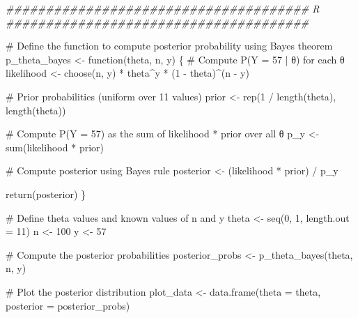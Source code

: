 \documentclass[
  letterpaper,
  DIV=11,
  numbers=noendperiod]{scrartcl}
\newenvironment{Shaded}{\begin{snugshade}}{\end{snugshade}}
\newcommand{\AttributeTok}[1]{\textcolor[rgb]{0.40,0.45,0.13}{#1}}
\newcommand{\CommentTok}[1]{\textcolor[rgb]{0.37,0.37,0.37}{#1}}
\newcommand{\ControlFlowTok}[1]{\textcolor[rgb]{0.00,0.23,0.31}{#1}}
\newcommand{\DecValTok}[1]{\textcolor[rgb]{0.68,0.00,0.00}{#1}}
\newcommand{\DocumentationTok}[1]{\textcolor[rgb]{0.37,0.37,0.37}{\textit{#1}}}
\newcommand{\FunctionTok}[1]{\textcolor[rgb]{0.28,0.35,0.67}{#1}}
\newcommand{\NormalTok}[1]{\textcolor[rgb]{0.00,0.23,0.31}{#1}}
\newcommand{\OtherTok}[1]{\textcolor[rgb]{0.00,0.23,0.31}{#1}}
\newcommand{\SpecialCharTok}[1]{\textcolor[rgb]{0.37,0.37,0.37}{#1}}
\begin{document}
\begin{Shaded}
\begin{Highlighting}[]
\DocumentationTok{\#\#\#\#\#\#\#\#\#\#\#\#\#\#\#\#\#\#\#\#\#\#\#\#\#\#\#\#\#\#\#\#\#\#\#\#\#\# R \#\#\#\#\#\#\#\#\#\#\#\#\#\#\#\#\#\#\#\#\#\#\#\#\#\#\#\#\#\#\#\#\#\#\#\#\#\#}

\CommentTok{\# Define the function to compute posterior probability using Bayes\textquotesingle{} theorem}
\NormalTok{p\_theta\_bayes }\OtherTok{\textless{}{-}} \ControlFlowTok{function}\NormalTok{(theta, n, y) \{}
    \CommentTok{\# Compute P(Y = 57 | θ) for each θ}
\NormalTok{    likelihood }\OtherTok{\textless{}{-}} \FunctionTok{choose}\NormalTok{(n, y) }\SpecialCharTok{*}\NormalTok{ theta}\SpecialCharTok{\^{}}\NormalTok{y }\SpecialCharTok{*}\NormalTok{ (}\DecValTok{1} \SpecialCharTok{{-}}\NormalTok{ theta)}\SpecialCharTok{\^{}}\NormalTok{(n }\SpecialCharTok{{-}}\NormalTok{ y)}

    \CommentTok{\# Prior probabilities (uniform over 11 values)}
\NormalTok{    prior }\OtherTok{\textless{}{-}} \FunctionTok{rep}\NormalTok{(}\DecValTok{1} \SpecialCharTok{/} \FunctionTok{length}\NormalTok{(theta), }\FunctionTok{length}\NormalTok{(theta))}

    \CommentTok{\# Compute P(Y = 57) as the sum of likelihood * prior over all θ}
\NormalTok{    p\_y }\OtherTok{\textless{}{-}} \FunctionTok{sum}\NormalTok{(likelihood }\SpecialCharTok{*}\NormalTok{ prior)}

    \CommentTok{\# Compute posterior using Bayes\textquotesingle{} rule}
\NormalTok{    posterior }\OtherTok{\textless{}{-}}\NormalTok{ (likelihood }\SpecialCharTok{*}\NormalTok{ prior) }\SpecialCharTok{/}\NormalTok{ p\_y}

    \FunctionTok{return}\NormalTok{(posterior)}
\NormalTok{\}}

\CommentTok{\# Define theta values and known values of n and y}
\NormalTok{theta }\OtherTok{\textless{}{-}} \FunctionTok{seq}\NormalTok{(}\DecValTok{0}\NormalTok{, }\DecValTok{1}\NormalTok{, }\AttributeTok{length.out =} \DecValTok{11}\NormalTok{)}
\NormalTok{n }\OtherTok{\textless{}{-}} \DecValTok{100}
\NormalTok{y }\OtherTok{\textless{}{-}} \DecValTok{57}

\CommentTok{\# Compute the posterior probabilities}
\NormalTok{posterior\_probs }\OtherTok{\textless{}{-}} \FunctionTok{p\_theta\_bayes}\NormalTok{(theta, n, y)}

\CommentTok{\# Plot the posterior distribution}
\NormalTok{plot\_data }\OtherTok{\textless{}{-}} \FunctionTok{data.frame}\NormalTok{(}\AttributeTok{theta =}\NormalTok{ theta, }\AttributeTok{posterior =}\NormalTok{ posterior\_probs)}


\end{Highlighting}
\end{Shaded}
\end{document}
